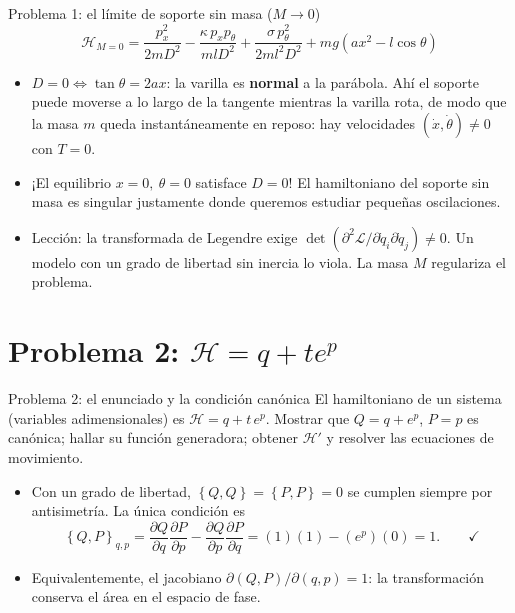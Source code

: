 \documentclass[spanish]{beamer}
\newcommand{\Lag}{\mathcal{L}}
\newcommand{\Ham}{\mathcal{H}}
\newcommand{\pd}[2]{\frac{\partial #1}{\partial #2}}
\newcommand{\pb}[2]{\left\{#1,#2\right\}}   %
\begin{document}
\begin{frame}{Problema 1: el límite de soporte sin masa ($M\to 0$)}
\[
  \Ham_{M=0} = \frac{p_x^2}{2mD^2} - \frac{\kappa\,p_x p_\theta}{m l D^2}
             + \frac{\sigma\,p_\theta^2}{2 m l^2 D^2} + m g\left(a x^2 - l\cos\theta\right)
\]
\pause
\begin{itemize}
  \item<2-> $D=0 \iff \tan\theta = 2ax$: la varilla es \textbf{normal} a la parábola.
        Ahí el soporte puede moverse a lo largo de la tangente mientras la varilla
        rota, de modo que la masa $m$ queda instantáneamente en reposo:
        hay velocidades $(\dot x,\dot\theta)\neq 0$ con $T=0$.
  \item<3-> ¡El equilibrio $x=0,\ \theta=0$ satisface $D=0$! El hamiltoniano del
        soporte sin masa es singular justamente donde queremos estudiar
        pequeñas oscilaciones.
  \item<4-> Lección: la transformada de Legendre exige
        $\det\left(\partial^2\Lag/\partial\dot q_i\partial\dot q_j\right)\neq 0$.
        Un modelo con un grado de libertad sin inercia lo viola.
        La masa $M$ regulariza el problema.
\end{itemize}
\end{frame}

\section{Problema 2: \texorpdfstring{$\Ham = q + t e^p$}{H = q + t exp(p)}}

\begin{frame}{Problema 2: el enunciado y la condición canónica}
El hamiltoniano de un sistema (variables adimensionales) es $\Ham = q + t\,e^{p}$.
Mostrar que $Q = q + e^{p}$, $P = p$ es canónica; hallar su función generadora;
obtener $\Ham'$ y resolver las ecuaciones de movimiento.
\pause
\begin{itemize}
  \item<2-> Con un grado de libertad, $\pb{Q}{Q}=\pb{P}{P}=0$ se cumplen siempre
        por antisimetría. La única condición es
  \[
    \pb{Q}{P}_{q,p} = \pd{Q}{q}\pd{P}{p} - \pd{Q}{p}\pd{P}{q}
                    = (1)(1) - (e^{p})(0) = 1 . \qquad \checkmark
  \]
  \item<3-> Equivalentemente, el jacobiano $\partial(Q,P)/\partial(q,p)=1$:
        la transformación conserva el área en el espacio de fase.
\end{itemize}
\end{frame}
\end{document}

